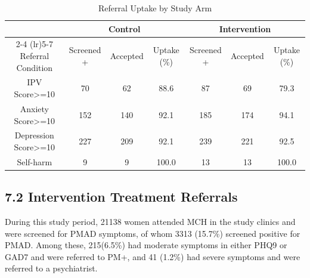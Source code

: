 \documentclass[
]{article}
\begin{document}
\newpage
\begin{table}[t]
\caption*{
{\large Referral Uptake by Study Arm}
} 
\fontsize{7.5pt}{9.0pt}\selectfont
\begin{tabular*}{1\linewidth}{@{\extracolsep{\fill}}ccccccc}
\toprule
 & \multicolumn{3}{c}{Control} & \multicolumn{3}{c}{Intervention} \\ 
\cmidrule(lr){2-4} \cmidrule(lr){5-7}
Referral Condition & Screened + & Accepted & Uptake (\%) & Screened + & Accepted & Uptake (\%) \\ 
\midrule\addlinespace[2.5pt]
IPV Score>=10 & 70 & 62 & 88.6 & 87 & 69 & 79.3 \\ 
Anxiety Score>=10 & 152 & 140 & 92.1 & 185 & 174 & 94.1 \\ 
Depression Score>=10 & 227 & 209 & 92.1 & 239 & 221 & 92.5 \\ 
Self-harm & 9 & 9 & 100.0 & 13 & 13 & 100.0 \\ 
\bottomrule
\end{tabular*}
\end{table}

\newpage

\hypertarget{intervention-treatment-referrals}{%
\subsection{7.2 Intervention Treatment
Referrals}\label{intervention-treatment-referrals}}

During this study period, 21138 women attended MCH in the study clinics
and were screened for PMAD symptoms, of whom 3313 (15.7\%) screened
positive for PMAD. Among these, 215(6.5\%) had moderate symptoms in
either PHQ9 or GAD7 and were referred to PM+, and 41 (1.2\%) had severe
symptoms and were referred to a psychiatrist.
\end{document}
